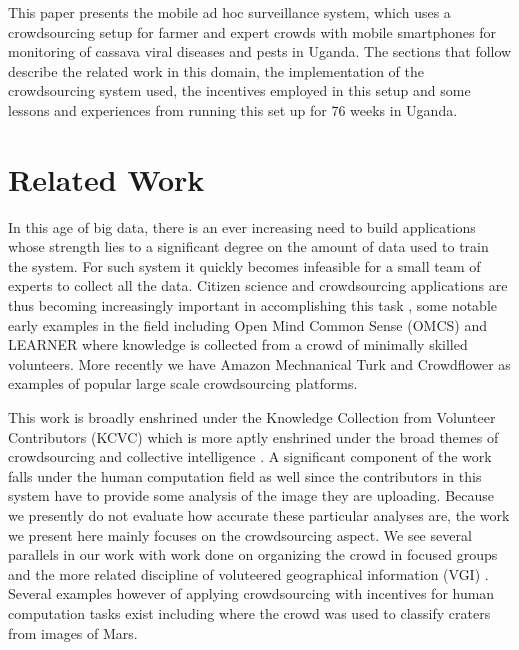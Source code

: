 \documentclass[letterpaper]{article} %
\begin{document}
This paper presents the mobile ad hoc surveillance system, which uses a crowdsourcing setup for farmer and expert crowds with mobile smartphones for monitoring of cassava viral diseases and pests in Uganda. The sections that follow describe the related work in this domain, the implementation of the crowdsourcing system used, the incentives employed in this setup and some lessons and experiences from running this set up for 76 weeks in Uganda.


\section{Related Work}
In this age of big data, there is an ever increasing need to build applications whose strength lies to a significant degree on the amount of data used to train the system. For such system it quickly becomes infeasible for a small team of experts to collect all the data. Citizen science and crowdsourcing applications are thus becoming increasingly important in accomplishing this task \cite{kittur2013future}, some notable early examples in the field including Open Mind Common Sense (OMCS) \cite{singh2002open} and LEARNER \cite{chklovski2003learner} where knowledge is collected from a crowd of minimally skilled volunteers. More recently we have Amazon Mechnanical Turk \cite{paolacci2010running} and Crowdflower \cite{van2012designing} as examples of popular large scale crowdsourcing platforms.

This work is broadly enshrined under the Knowledge Collection from Volunteer Contributors (KCVC) \cite{chklovski2005towards} which is more aptly enshrined under the broad themes of crowdsourcing and collective intelligence \cite{quinn2011human}. A significant component of the work falls under the human computation field as well since the contributors in this system have to provide some analysis of the image they are uploading. Because we presently do not evaluate how accurate these particular analyses are, the work we present here mainly focuses on the crowdsourcing aspect. We see several parallels in our work with work done on organizing the crowd in focused groups \cite{zhu2012organizing} and the more related discipline of voluteered geographical information (VGI) \cite{haklay2013citizen}. Several examples however of applying crowdsourcing with incentives for human computation tasks exist including \cite{kanefsky2001can} where the crowd was used to classify craters from images of Mars.
\end{document}
